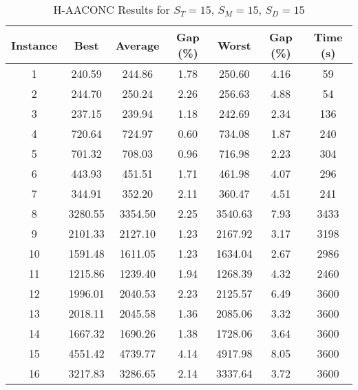 \begin{table}[h]
	\centering
	\caption{H-AACONC Results for $S_T=15$, $S_M=15$, $S_D=15$}
	\begin{tabular}{@{}ccccccc@{}}
		\midrule
		\textbf{Instance} & \textbf{Best} & \textbf{Average} & \textbf{Gap (\%)} & \textbf{Worst} & \textbf{Gap (\%)} & \textbf{Time (s)} \\ \midrule
		1  & 240.59 & 244.86 & 1.78 & 250.60 & 4.16 & 59   \\ \midrule
		2  & 244.70 & 250.24 & 2.26 & 256.63 & 4.88 & 54  \\ \midrule
		3  & 237.15 & 239.94 & 1.18 & 242.69 & 2.34 & 136  \\ \midrule
		4  & 720.64 & 724.97 & 0.60 & 734.08 & 1.87 & 240  \\ \midrule
		5  & 701.32 & 708.03 & 0.96 & 716.98 & 2.23 & 304  \\ \midrule
		6  & 443.93 & 451.51 & 1.71 & 461.98 & 4.07 & 296  \\ \midrule
		7  & 344.91 & 352.20 & 2.11 & 360.47 & 4.51 & 241  \\ \midrule
		8  & 3280.55 & 3354.50 & 2.25 & 3540.63 & 7.93 & 3433  \\ \midrule
		9  & 2101.33 & 2127.10 & 1.23 & 2167.92 & 3.17 & 3198  \\ \midrule
		10 & 1591.48 & 1611.05 & 1.23 & 1634.04 & 2.67 & 2986  \\ \midrule
		11 & 1215.86 & 1239.40 & 1.94 & 1268.39 & 4.32 & 2460  \\ \midrule
		12 & 1996.01 & 2040.53 & 2.23 & 2125.57 & 6.49 & 3600  \\ \midrule
		13 & 2018.11 & 2045.58 & 1.36 & 2085.06 & 3.32 & 3600  \\ \midrule
		14 & 1667.32 & 1690.26 & 1.38 & 1728.06 & 3.64 & 3600  \\ \midrule
		15 & 4551.42 & 4739.77 & 4.14 & 4917.98 & 8.05 & 3600  \\ \midrule
		16 & 3217.83 & 3286.65 & 2.14 & 3337.64 & 3.72 & 3600  \\ \midrule
	\end{tabular}
	\label{table:ACO_15-15-15}
\end{table}